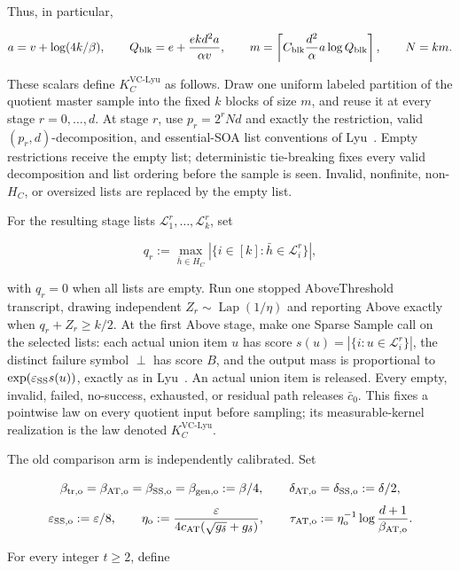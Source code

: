 Thus, in particular,

\[
 a=v+\log(4k/\beta),\qquad
 Q_{\rm blk}=e+\frac{ekd^2a}{\alpha v},\qquad
 m=\left\lceil C_{\rm blk}\frac{d^2}{\alpha}
 a\log Q_{\rm blk}\right\rceil,\qquad N=km.
\]

These scalars define $K_C^{\mathrm{VC\text{-}Lyu}}$ as follows.  Draw one
uniform labeled partition of the quotient master sample into the fixed $k$
blocks of size $m$, and reuse it at every stage $r=0,\ldots,d$.  At stage
$r$, use $p_r=2^rNd$ and exactly the restriction, valid
$(p_r,d)$-decomposition, and essential-SOA list conventions of
Lyu~\citep[Definitions~4.2--4.3, Lemmas~4.1 and~4.3, Corollary~4.1,
and the construction in Theorem~3]{lyu2025}.  Empty restrictions receive
the empty list; deterministic tie-breaking fixes every valid decomposition
and list ordering before the sample is seen.  Invalid, nonfinite,
non-$H_C$, or oversized lists are replaced by the empty list.

For the resulting stage lists $\mathcal L_1^r,\ldots,\mathcal L_k^r$, set

\[
 q_r:=\max_{\bar h\in H_C}
 |\{i\in[k]:\bar h\in\mathcal L_i^r\}|,
\]

with $q_r=0$ when all lists are empty.  Run one stopped AboveThreshold
transcript, drawing independent $Z_r\sim\operatorname{Lap}(1/\eta)$ and
reporting Above exactly when $q_r+Z_r\ge k/2$.  At the first Above stage,
make one Sparse Sample call on the selected lists: each actual union item
$u$ has score $s(u)=|\{i:u\in\mathcal L_i^r\}|$, the distinct failure
symbol $\perp$ has score $B$, and the output mass is proportional to
$\exp(\varepsilon_{\rm SS}s(u))$, exactly as in
Lyu~\citep[Algorithm~1 and Lemma~3.1]{lyu2025}.  An actual union item is
released.  Every empty, invalid, failed, no-success, exhausted, or residual
path releases $\bar c_0$.  This fixes a pointwise law on every quotient
input before sampling; its measurable-kernel realization is the law denoted
$K_C^{\mathrm{VC\text{-}Lyu}}$.

The old comparison arm is independently calibrated.  Set

\[
 \beta_{\rm tr,o}=\beta_{\rm AT,o}=\beta_{\rm SS,o}
 =\beta_{\rm gen,o}:=\beta/4,
 \qquad
 \delta_{\rm AT,o}=\delta_{\rm SS,o}:=\delta/2,
\]
\[
 \varepsilon_{\rm SS,o}:=\varepsilon/8,
 \qquad
 \eta_{\rm o}:=\frac{\varepsilon}
 {4c_{\rm AT}(\sqrt{g_\delta}+g_\delta)},
 \qquad
 \tau_{\rm AT,o}:=\eta_{\rm o}^{-1}
 \log\frac{d+1}{\beta_{\rm AT,o}}.
\]

For every integer $t\ge2$, define

